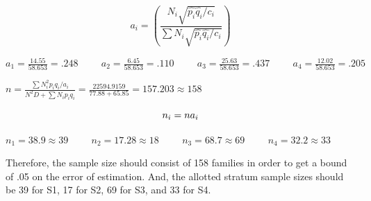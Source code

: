 \documentclass{article}
\begin{document}
\begin{equation}
    a_i = (\frac{N_i \sqrt{\hat{p_i}\hat{q_i}/ c_i}}{\sum N_i \sqrt{\hat{p_i}\hat{q_i}/ c_i}})
\end{equation}
\begin{center}
    $a_1 = \frac{14.55}{58.653} = .248 \hspace{1cm} a_2 = \frac{6.45}{58.653} = .110 \hspace{1cm} a_3 = \frac{25.63}{58.653} = .437 \hspace{1cm} a_4 = \frac{12.02}{58.653} = .205 $ \\ 
\end{center}
\begin{center}
    $n = \frac{\sum N_i^2 p_i q_i / a_i}{N^2 D + \sum N_i p_i q_i} = \frac{22594.9159}{77.88+65.85} = 157.203 \approx 158 $
\end{center}
\begin{equation}
    n_i = na_i \\
\end{equation}
\begin{center}
    $n_1 = 38.9 \approx 39 \hspace{1cm} n_2 = 17.28 \approx 18 \hspace{1cm} n_3 = 68.7 \approx 69 \hspace{1cm} n_4 = 32.2 \approx 33 $ \\
\end{center}
Therefore, the sample size should consist of 158 families in order to get a bound of .05 on the error of estimation. And, the allotted stratum sample sizes should be 39 for S1, 17 for S2, 69 for S3, and 33 for S4. 
\end{document}
